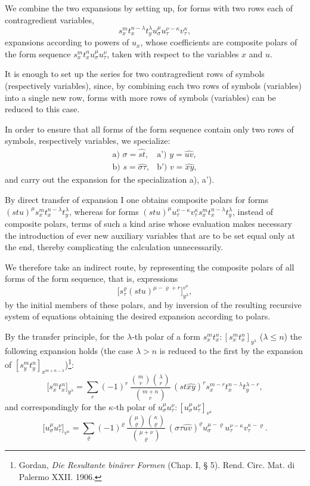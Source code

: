 \documentclass[11pt]{article}
\begin{document}
We combine the two expansions by setting up, for forms with two rows each of contragredient variables,
\[
s_x^m t_x^{n-\lambda}t_y^\lambda u_\sigma^\mu u_\tau^{\nu-\kappa}v_\tau^\kappa,
\]
expansions according to powers of $u_x$, whose coefficients are composite polars of the form sequence $s_x^m t_x^n u_\sigma^\mu u_\tau^\nu$, taken with respect to the variables $x$ and $u$.

It is enough to set up the series for two contragredient rows of symbols (respectively variables), since, by combining each two rows of symbols (variables) into a single new row, forms with more rows of symbols (variables) can be reduced to this case.

In order to ensure that all forms of the form sequence contain only two rows of symbols, respectively variables, we specialize:
\[
\begin{array}{ll}
\text{a) } \sigma=\widehat{st}, & \text{a') } y=\widehat{uv},\\[0.3em]
\text{b) } s=\widehat{\sigma\tau}, & \text{b') } v=\widehat{xy},
\end{array}
\]
and carry out the expansion for the specialization a), a').

By direct transfer of expansion I one obtains composite polars for forms $(stu)^\mu s_x^m t_x^{n-\lambda}t_y^\lambda$, whereas for forms $(stu)^\mu u_\tau^{\nu-\kappa}v_\tau^\kappa s_x^m t_x^{n-\lambda}t_y^\lambda$, instead of composite polars, terms of such a kind arise whose evaluation makes necessary the introduction of ever new auxiliary variables that are to be set equal only at the end, thereby complicating the calculation unnecessarily.

We therefore take an indirect route, by representing the composite polars of all forms of the form sequence, that is, expressions
\[
\bigl[s_\tau^\varrho(stu)^{\mu-\varrho+r}\bigr]_{y^\lambda}^{v^\kappa},
\]
by the initial members of these polars, and by inversion of the resulting recursive system of equations obtaining the desired expansion according to polars.

By the transfer principle, for the $\lambda$-th polar of a form $s_x^m t_x^n:[s_x^m t_x^n]_{y^\lambda}$ ($\lambda\le n$) the following expansion holds (the case $\lambda>n$ is reduced to the first by the expansion of $[s_y^m t_y^n]_{x^{m+n-\lambda}}$)\footnote{Gordan, \emph{Die Resultante binärer Formen} (Chap. I, § 5). Rend. Circ. Mat. di Palermo XXII. 1906.}:
\[
\bigl[s_x^m t_x^n\bigr]_{y^\lambda}
=\sum_r (-1)^r\,
\frac{\binom{m}{r}\binom{\lambda}{r}}{\binom{m+n}{r}}\,
(st\widehat{xy})^r s_x^{m-r}t_x^{n-\lambda}t_y^{\lambda-r},
\]
and correspondingly for the $\kappa$-th polar of $u_\sigma^\mu u_\tau^\nu:[u_\sigma^\mu u_\tau^\nu]_{v^\kappa}$
\[
\bigl[u_\sigma^\mu u_\tau^\nu\bigr]_{v^\kappa}
=\sum_\varrho (-1)^\varrho\,
\frac{\binom{\mu}{\varrho}\binom{\kappa}{\varrho}}{\binom{\mu+\nu}{\varrho}}\,
(\sigma\tau\widehat{uv})^\varrho u_\sigma^{\mu-\varrho}u_\tau^{\nu-\kappa}v_\tau^{\kappa-\varrho}.
\]
\end{document}
